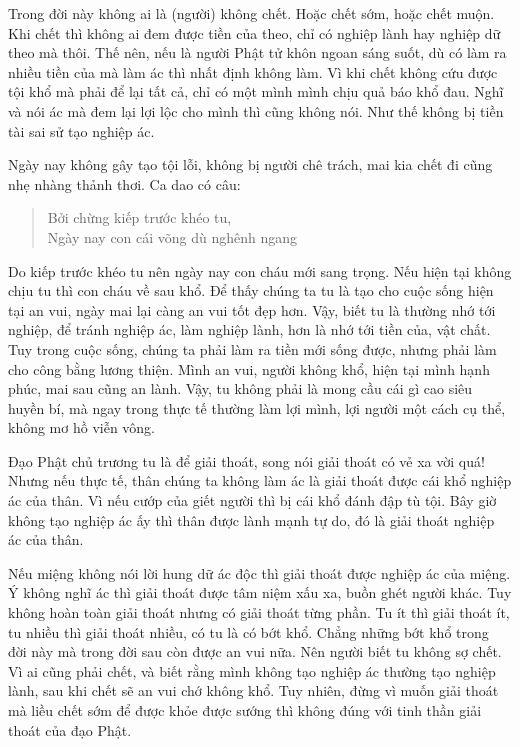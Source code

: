 \documentclass[
  12pt,
  oneside]{book}
\begin{document}
Trong đời này không ai là (người) không chết. Hoặc chết sớm, hoặc chết muộn. Khi chết thì không ai đem được tiền của theo, chỉ có nghiệp lành hay nghiệp dữ theo mà thôi. Thế nên, nếu là người Phật tử khôn ngoan sáng suốt, dù có làm ra nhiều tiền của mà làm ác thì nhất định không làm. Vì khi chết không cứu được tội khổ mà phải để lại tất cả, chỉ có một mình mình chịu quả báo khổ đau. Nghĩ và nói ác mà đem lại lợi lộc cho mình thì cũng không nói. Như thế không bị tiền tài sai sử tạo nghiệp ác.

Ngày nay không gây tạo tội lỗi, không bị người chê trách, mai kia chết đi cũng nhẹ nhàng thảnh thơi. Ca dao có câu:

\begin{quote}
Bởi chừng kiếp trước khéo tu,\\
Ngày nay con cái võng dù nghênh ngang
\end{quote}

Do kiếp trước khéo tu nên ngày nay con cháu mới sang trọng. Nếu hiện tại không chịu tu thì con cháu về sau khổ. Để thấy chúng ta tu là tạo cho cuộc sống hiện tại an vui, ngày mai lại càng an vui tốt đẹp hơn. Vậy, biết tu là thường nhớ tới nghiệp, để tránh nghiệp ác, làm nghiệp lành, hơn là nhớ tới tiền của, vật chất. Tuy trong cuộc sống, chúng ta phải làm ra tiền mới sống được, nhưng phải làm cho công bằng lương thiện. Mình an vui, người không khổ, hiện tại mình hạnh phúc, mai sau cũng an lành. Vậy, tu không phải là mong cầu cái gì cao siêu huyền bí, mà ngay trong thực tế thường làm lợi mình, lợi người một cách cụ thể, không mơ hồ viễn vông.

Đạo Phật chủ trương tu là để giải thoát, song nói giải thoát có vẻ xa vời quá! Nhưng nếu thực tế, thân chúng ta không làm ác là giải thoát được cái khổ nghiệp ác của thân. Vì nếu cướp của giết người thì bị cái khổ đánh đập tù tội. Bây giờ không tạo nghiệp ác ấy thì thân được lành mạnh tự do, đó là giải thoát nghiệp ác của thân.

Nếu miệng không nói lời hung dữ ác độc thì giải thoát được nghiệp ác của miệng. Ý không nghĩ ác thì giải thoát được tâm niệm xấu xa, buồn ghét người khác. Tuy không hoàn toàn giải thoát nhưng có giải thoát từng phần. Tu ít thì giải thoát ít, tu nhiều thì giải thoát nhiều, có tu là có bớt khổ. Chẳng những bớt khổ trong đời này mà trong đời sau còn được an vui nữa. Nên người biết tu không sợ chết. Vì ai cũng phải chết, và biết rằng mình không tạo nghiệp ác thường tạo nghiệp lành, sau khi chết sẽ an vui chớ không khổ. Tuy nhiên, đừng vì muốn giải thoát mà liều chết sớm để được khỏe được sướng thì không đúng với tinh thần giải thoát của đạo Phật.
\end{document}
